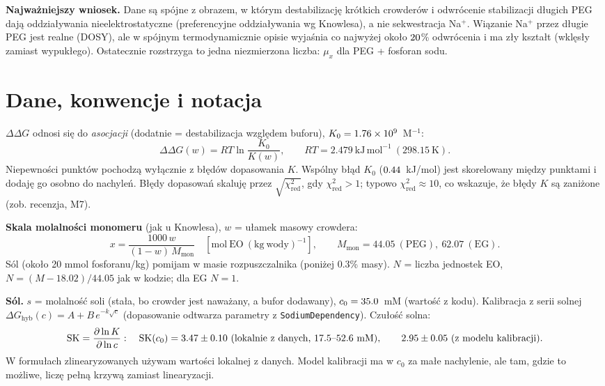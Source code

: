 \documentclass[10pt,a4paper]{article}
\newcommand{\dG}{\Delta\Delta G}
\begin{document}
\medskip
\textbf{Najważniejszy wniosek.} Dane są spójne z obrazem, w którym destabilizację krótkich crowderów i odwrócenie stabilizacji długich PEG dają oddziaływania nieelektrostatyczne (preferencyjne oddziaływania wg Knowlesa), a nie sekwestracja Na$^+$. Wiązanie Na$^+$ przez długie PEG jest realne (DOSY), ale w spójnym termodynamicznie opisie wyjaśnia co najwyżej około $20$\% odwrócenia i ma zły kształt (wklęsły zamiast wypukłego). Ostatecznie rozstrzyga to jedna niezmierzona liczba: $\mu_x$ dla PEG + fosforan sodu.

\section{Dane, konwencje i notacja}

$\dG$ odnosi się do \emph{asocjacji} (dodatnie = destabilizacja względem buforu), $K_0=1.76\times10^{9}$~M$^{-1}$:
\begin{equation}
\dG(w) = RT\ln\frac{K_0}{K(w)},\qquad RT = 2.479~\mathrm{kJ\,mol^{-1}}\ (298.15~\mathrm{K}).
\end{equation}
Niepewności punktów pochodzą wyłącznie z błędów dopasowania $K$. Wspólny błąd $K_0$ ($0.44$~kJ/mol) jest skorelowany między punktami i dodaję go osobno do nachyleń. Błędy dopasowań skaluję przez $\sqrt{\chi^2_\mathrm{red}}$, gdy $\chi^2_\mathrm{red}>1$; typowo $\chi^2_\mathrm{red}\approx10$, co wskazuje, że błędy $K$ są zaniżone (zob. recenzja, M7).

\textbf{Skala molalności monomeru} (jak u Knowlesa), $w$ = ułamek masowy crowdera:
\begin{equation}
x = \frac{1000\,w}{(1-w)\,M_\mathrm{mon}}\quad[\mathrm{mol\ EO\ (kg\ wody)^{-1}}],\qquad M_\mathrm{mon}=44.05\ (\mathrm{PEG}),\ 62.07\ (\mathrm{EG}).
\end{equation}
Sól (około 20 mmol fosforanu/kg) pomijam w masie rozpuszczalnika (poniżej 0.3\% masy). $N$ = liczba jednostek EO, $N=(M-18.02)/44.05$ jak w kodzie; dla EG $N=1$.

\textbf{Sól.} $s$ = molalność soli (stała, bo crowder jest naważany, a bufor dodawany), $c_0=35.0$~mM (wartość z kodu). Kalibracja z serii solnej $\Delta G_\mathrm{hyb}(c)=A+B\,e^{-k\sqrt c}$ (dopasowanie odtwarza parametry z \texttt{SodiumDependency}). Czułość solna:
\begin{equation}
\mathrm{SK}=\frac{\partial\ln K}{\partial\ln c}:\quad \mathrm{SK}(c_0)=3.47\pm0.10\ \text{(lokalnie z danych, 17.5--52.6 mM)},\qquad 2.95\pm0.05\ \text{(z modelu kalibracji)}.
\end{equation}
W formułach zlinearyzowanych używam wartości lokalnej z danych. Model kalibracji ma w $c_0$ za małe nachylenie, ale tam, gdzie to możliwe, liczę pełną krzywą zamiast linearyzacji.
\end{document}
